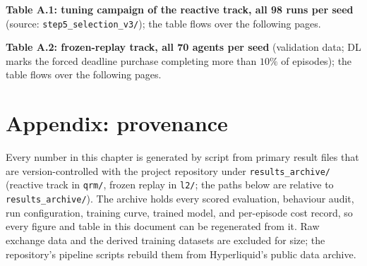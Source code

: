 \documentclass[11pt]{article}
\begin{document}
\noindent\textbf{Table A.1: tuning campaign of the reactive track, all 98 runs per
seed} (source: \texttt{step5\_selection\_v3/}); the table flows over the
following pages.
\begin{center}\scriptsize\end{center}
\noindent\textbf{Table A.2: frozen-replay track, all 70 agents per seed}
(validation data; DL marks the forced deadline purchase completing more than $10\%$ of
episodes); the table flows over the following pages.
\begin{center}\scriptsize\end{center}
\clearpage

\clearpage
\section{Appendix: provenance}\label{sec:provenance}

Every number in this chapter is generated by script from primary result files that are
version-controlled with the project repository under \texttt{results\_archive/} (reactive
track in \texttt{qrm/}, frozen replay in \texttt{l2/}; the paths below are relative to
\texttt{results\_archive/}). The archive holds every scored evaluation, behaviour audit,
run configuration, training curve, trained model, and per-episode cost record, so every
figure and table in this document can be regenerated from it. Raw exchange data and the
derived training datasets are excluded for size; the repository's pipeline scripts rebuild
them from Hyperliquid's public data archive.
\end{document}
